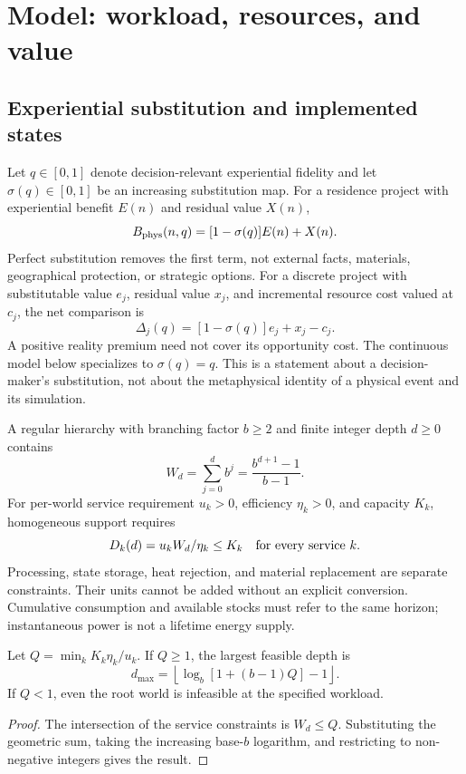 \section{Model: workload, resources, and value}
\label{sec:support}
\label{sec:allocation}
\subsection{Experiential substitution and implemented states}
Let $q\in[0,1]$ denote decision-relevant experiential fidelity and let
$\sigma(q)\in[0,1]$ be an increasing substitution map. For a residence
project with experiential benefit $E(n)$ and residual value $X(n)$,
\begin{equation}
 B_{\rm phys}(n,q)=[1-\sigma(q)]E(n)+X(n).
 \label{eq:experiential}
\end{equation}
Perfect substitution removes the first term, not external facts, materials,
geographical protection, or strategic options. For a discrete project with
substitutable value $e_j$, residual value $x_j$, and incremental resource
cost valued at $c_j$, the net comparison is
\begin{equation}
 \Delta_j(q)=[1-\sigma(q)]e_j+x_j-c_j.\label{eq:premium}
\end{equation}
A positive reality premium need not cover its opportunity cost. The
continuous model below specializes to $\sigma(q)=q$. This is a statement
about a decision-maker's substitution, not about the metaphysical identity
of a physical event and its simulation.

A regular hierarchy with branching factor $b\geq2$ and finite integer
depth $d\geq0$ contains
\begin{equation}
 W_d=\sum_{j=0}^{d}b^j=\frac{b^{d+1}-1}{b-1}.\label{eq:worlds}
\end{equation}
For per-world service requirement $u_k>0$, efficiency $\eta_k>0$, and
capacity $K_k$, homogeneous support requires
\begin{equation}
 D_k(d)=u_kW_d/\eta_k\leq K_k\quad\hbox{for every service }k.
 \label{eq:resource}
\end{equation}
Processing, state storage, heat rejection, and material replacement are
separate constraints. Their units cannot be added without an explicit
conversion. Cumulative consumption and available stocks must refer to the
same horizon; instantaneous power is not a lifetime energy supply.

\begin{lemma}
\label{prop:depth}
Let $Q=\min_kK_k\eta_k/u_k$. If $Q\geq1$, the largest feasible depth is
\begin{equation}
 d_{\max}=\left\lfloor\log_b[1+(b-1)Q]-1\right\rfloor.
 \label{eq:depth-bound}
\end{equation}
If $Q<1$, even the root world is infeasible at the specified workload.
\end{lemma}
\begin{proof}
The intersection of the service constraints is $W_d\leq Q$. Substituting
the geometric sum, taking the increasing base-$b$ logarithm, and restricting
to non-negative integers gives the result.
\end{proof}

